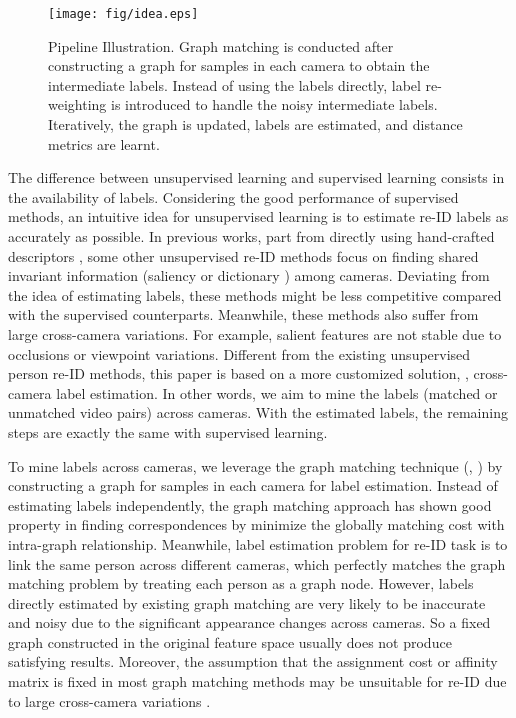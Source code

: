 \documentclass[10pt,twocolumn,letterpaper]{article}
\begin{document}
\begin{figure}[t]
  \centering
  \texttt{[image: fig/idea.eps]}\\
  \caption{\small{Pipeline Illustration. Graph matching is conducted after constructing a graph for samples in each camera to obtain the intermediate labels. Instead of using the labels directly, label re-weighting is introduced to handle the noisy intermediate labels. Iteratively, the graph is updated, labels are estimated, and distance metrics are learnt.}}\label{fig:idea}
\end{figure}

The difference between unsupervised learning and supervised learning consists in the availability of labels. Considering the good performance of supervised methods, an intuitive idea for unsupervised learning is to estimate re-ID labels as accurately as possible. In previous works, part from directly using hand-crafted descriptors \cite{eccv14yang,cvpr15lomo,cvpr16gog,iccv15des}, some other unsupervised re-ID methods focus on finding shared invariant information (saliency \cite{cvpr13saliency} or dictionary \cite{eccv16un,cvpr16un}) among cameras. Deviating from the idea of estimating labels, these methods \cite{cvpr13saliency,eccv16un,cvpr16un} might be less competitive compared with the supervised counterparts. Meanwhile, these methods also suffer from large cross-camera variations. For example, salient features are not stable due to occlusions or viewpoint variations. Different from the existing unsupervised person re-ID methods, this paper is based on a more customized solution, \ie, cross-camera label estimation. In other words, we aim to mine the labels (matched or unmatched video pairs) across cameras. With the estimated labels, the remaining steps are exactly the same with supervised learning.


To mine labels across cameras, we leverage the graph matching technique (\eg, \cite{pami16gm}) by constructing a graph for samples in each camera for label estimation. Instead of estimating labels independently, the graph matching approach has shown good property in finding correspondences by minimize the globally matching cost with intra-graph relationship.
Meanwhile, label estimation problem for re-ID task is to link the same person across different cameras, which perfectly matches the graph matching problem by treating each person as a graph node.
However, labels directly estimated by existing graph matching are very likely to be inaccurate and noisy due to the significant appearance changes across cameras. So a fixed graph constructed in the original feature space usually does not produce satisfying results. Moreover, the assumption that the assignment cost or affinity matrix is fixed in most graph matching methods may be unsuitable for re-ID due to large cross-camera variations \cite{ijcv12gm,iccv15joint,cho10rrwm,pami16gm}.
\end{document}
